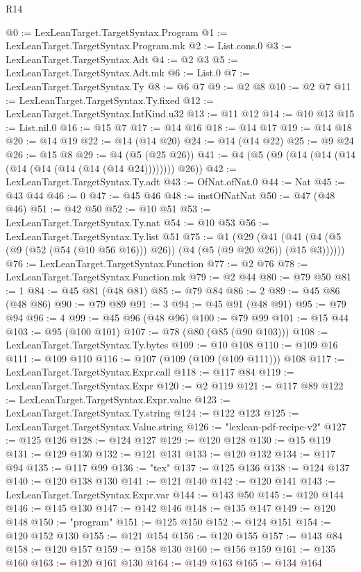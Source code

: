 \begin{lexlean}{R14}
\begin{coremodule}
@0 := LexLeanTarget.TargetSyntax.Program
@1 := LexLeanTarget.TargetSyntax.Program.mk
@2 := List.cons.{0}
@3 := LexLeanTarget.TargetSyntax.Adt
@4 := @2 @3
@5 := LexLeanTarget.TargetSyntax.Adt.mk
@6 := List.{0}
@7 := LexLeanTarget.TargetSyntax.Ty
@8 := @6 @7
@9 := @2 @8
@10 := @2 @7
@11 := LexLeanTarget.TargetSyntax.Ty.fixed
@12 := LexLeanTarget.TargetSyntax.IntKind.u32
@13 := @11 @12
@14 := @10 @13
@15 := List.nil.{0}
@16 := @15 @7
@17 := @14 @16
@18 := @14 @17
@19 := @14 @18
@20 := @14 @19
@22 := @14 (@14 @20)
@24 := @14 (@14 @22)
@25 := @9 @24
@26 := @15 @8
@29 := @4 (@5 (@25 @26))
@41 := @4 (@5 (@9 (@14 (@14 (@14 (@14 (@14 (@14 (@14 (@14 @24)))))))) @26))
@42 := LexLeanTarget.TargetSyntax.Ty.adt
@43 := OfNat.ofNat.{0}
@44 := Nat
@45 := @43 @44
@46 := 0
@47 := @45 @46
@48 := instOfNatNat
@50 := @47 (@48 @46)
@51 := @42 @50
@52 := @10 @51
@53 := LexLeanTarget.TargetSyntax.Ty.nat
@54 := @10 @53
@56 := LexLeanTarget.TargetSyntax.Ty.list @51
@75 := @1
    (@29 (@41 (@41 (@4 (@5 (@9 (@52 (@54 (@10 @56 @16))) @26)) (@4 (@5 (@9 @20 @26)) (@15 @3))))))
@76 := LexLeanTarget.TargetSyntax.Function
@77 := @2 @76
@78 := LexLeanTarget.TargetSyntax.Function.mk
@79 := @2 @44
@80 := @79 @50
@81 := 1
@84 := @45 @81 (@48 @81)
@85 := @79 @84
@86 := 2
@89 := @45 @86 (@48 @86)
@90 := @79 @89
@91 := 3
@94 := @45 @91 (@48 @91)
@95 := @79 @94
@96 := 4
@99 := @45 @96 (@48 @96)
@100 := @79 @99
@101 := @15 @44
@103 := @95 (@100 @101)
@107 := @78 (@80 (@85 (@90 @103)))
@108 := LexLeanTarget.TargetSyntax.Ty.bytes
@109 := @10 @108
@110 := @109 @16
@111 := @109 @110
@116 := @107 (@109 (@109 (@109 @111))) @108
@117 := LexLeanTarget.TargetSyntax.Expr.call
@118 := @117 @84
@119 := LexLeanTarget.TargetSyntax.Expr
@120 := @2 @119
@121 := @117 @89
@122 := LexLeanTarget.TargetSyntax.Expr.value
@123 := LexLeanTarget.TargetSyntax.Ty.string
@124 := @122 @123
@125 := LexLeanTarget.TargetSyntax.Value.string
@126 := "lexlean-pdf-recipe-v2"
@127 := @125 @126
@128 := @124 @127
@129 := @120 @128
@130 := @15 @119
@131 := @129 @130
@132 := @121 @131
@133 := @120 @132
@134 := @117 @94
@135 := @117 @99
@136 := "tex"
@137 := @125 @136
@138 := @124 @137
@140 := @120 @138 @130
@141 := @121 @140
@142 := @120 @141
@143 := LexLeanTarget.TargetSyntax.Expr.var
@144 := @143 @50
@145 := @120 @144
@146 := @145 @130
@147 := @142 @146
@148 := @135 @147
@149 := @120 @148
@150 := "program"
@151 := @125 @150
@152 := @124 @151
@154 := @120 @152 @130
@155 := @121 @154
@156 := @120 @155
@157 := @143 @84
@158 := @120 @157
@159 := @158 @130
@160 := @156 @159
@161 := @135 @160
@163 := @120 @161 @130
@164 := @149 @163
@165 := @134 @164

\end{coremodule}
\end{lexlean}
